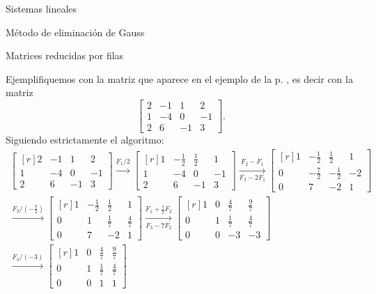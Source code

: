 \begin{chapter}{Sistemas lineales}
\begin{section}{Método de eliminación de Gauss }
\begin{subsection}{Matrices reducidas por filas}
                          
                \begin{ejemplo*} Ejemplifiquemos con la matriz que aparece en el ejemplo de la p. \pageref{ejemplo2.11},  es decir con la matriz
                    $$
                    \begin{bmatrix} 2& -1&1& 2 \\ 1&-4 &0&-1 \\ 2&6&-1&3 \end{bmatrix}.
                    $$
                    Siguiendo estrictamente el algoritmo:
                    \begin{multline*}
                    \begin{bmatrix*}[r] 2& -1&1& 2 \\ 1&-4 &0&-1 \\ 2&6&-1&3 \end{bmatrix*}
                    \stackrel{F_1/2}{\longrightarrow} 
                    \begin{bmatrix*}[r] 1& -\frac12&\frac12& 1 \\ 1&-4 &0&-1 \\ 2&6&-1&3 \end{bmatrix*}
                    \underset{F_3-2F_1}{\stackrel{F_2- F_1}{\longrightarrow}} 
                    \begin{bmatrix*}[r] 1& -\frac12&\frac12& 1 \\ 0&-\frac72 &-\frac12&-2 \\ 0&7&-2&1 \end{bmatrix*}
                    \\
                    \stackrel{F_2/(-\frac72)}{\longrightarrow} 
                    \begin{bmatrix*}[r] 1& -\frac12&\frac12& 1 \\ 0&1 &\frac17&\frac47 \\ 0&7&-2&1 \end{bmatrix*}
                    \underset{F_3-7F_2}{\stackrel{F_1 +\frac12 F_2}{\longrightarrow}} 
                    \begin{bmatrix*}[r] 1& 0&\frac47& \frac97 \\ 0&1 &\frac17&\frac47 \\ 0&0&-3&-3 \end{bmatrix*}
                    \\
                    \stackrel{F_3/(-3)}{\longrightarrow} 
                    \begin{bmatrix*}[r] 1& 0&\frac47& \frac97 \\ 0&1 &\frac17&\frac47 \\ 0&0&1&1 \end{bmatrix*}

\end{multline*}
\end{ejemplo*}
\end{subsection}
\end{section}
\end{chapter}
